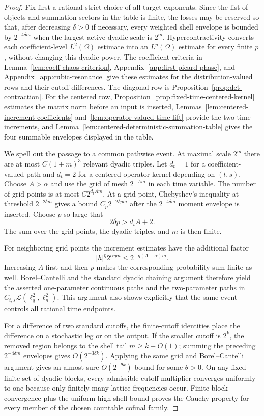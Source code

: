 \documentclass[10pt]{amsart}
\numberwithin{equation}{section}
\theoremstyle{plain}
\theoremstyle{definition}
\theoremstyle{remark}
\begin{document}
\begin{proof}
Fix first a rational strict choice of all target exponents.  Since the list of
objects and summation sectors in the table is finite, the losses may be
reserved so that, after decreasing $\delta>0$ if necessary, every weighted
shell envelope is bounded by $2^{-4\delta m}$ when the largest active dyadic
scale is $2^m$.  Hypercontractivity converts each coefficient-level
$L^2(\Omega)$ estimate into an $L^p(\Omega)$ estimate for every finite $p$,
without changing this dyadic power.  The coefficient criteria in
Lemma~\ref{lem:coeff-chaos-criterion}, Appendix~\ref{app:first-picard-phase},
and Appendix~\ref{app:cubic-resonance} give these estimates for the
distribution-valued rows and their cutoff differences.  The diagonal row is
Proposition~\ref{prop:det-contraction}.  For the centered row,
Proposition~\ref{prop:fixed-time-centered-kernel} estimates the matrix norm
before an input is inserted, Lemmas~\ref{lem:centered-increment-coefficients}
and~\ref{lem:operator-valued-time-lift} provide the two time increments, and
Lemma~\ref{lem:centered-deterministic-summation-table} gives the four
summable envelopes displayed in the table.

We spell out the passage to a common pathwise event.  At maximal scale $2^m$
there are at most $C(1+m)^3$ relevant dyadic triples.  Let $d_t=1$ for a
coefficient-valued path and $d_t=2$ for a centered operator kernel depending
on $(t,s)$.  Choose $A>\alpha$ and use the grid of mesh $2^{-Am}$ in each time
variable.  The number of grid points is at most $C2^{d_tAm}$.  At a grid
point, Chebyshev's inequality at threshold $2^{-2\delta m}$ gives a bound
$C_p2^{-2\delta pm}$ after the $2^{-4\delta m}$ moment envelope is inserted.
Choose $p$ so large that
\[
        2\delta p>d_tA+2.
\]
The sum over the grid points, the dyadic triples, and $m$ is then finite.

For neighboring grid points the increment estimates have the additional
factor
\[
        |h|^\eta 2^{\alpha\eta m}
        \le 2^{-\eta(A-\alpha)m}.
\]
Increasing $A$ first and then $p$ makes the corresponding probability sum
finite as well.  Borel--Cantelli and the standard dyadic chaining argument
therefore yield the asserted one-parameter continuous paths and the
two-parameter paths in
$C_{t,s}\mathcal L(\ell_q^2,\ell_n^2)$.  This argument also shows explicitly
that the same event controls all rational time endpoints.

For a difference of two standard cutoffs, the finite-cutoff identities place
the difference on a stochastic leg or on the output.  If the smaller cutoff
is $2^k$, the removed region belongs to the shell tail $m\ge k-O(1)$; summing
the preceding $2^{-4\delta m}$ envelopes gives $O(2^{-3\delta k})$.  Applying
the same grid and Borel--Cantelli argument gives an almost sure
$O(2^{-\theta k})$ bound for some $\theta>0$.  On any fixed finite set of
dyadic blocks, every admissible cutoff multiplier converges uniformly to one
because only finitely many lattice frequencies occur.  Finite-block convergence plus
the uniform high-shell bound proves the Cauchy property for every member of
the chosen countable cofinal family.


\end{proof}
\end{document}
